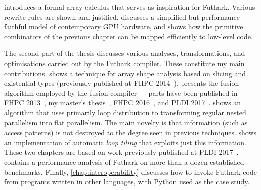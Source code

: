  introduces a formal array calculus that
serves as inspiration for Futhark.  Various rewrite rules are shown
and justified.   discusses a simplified but
performance-faithful model of contemporary GPU hardware, and shows
how the primitive combinators of the previous chapter can be mapped
efficiently to low-level code.

The second part of the thesis discusses various analyses,
transformations, and optimisations carried out by the Futhark
compiler.  These constitute my main contributions.
 shows a technique for array shape
analysis based on slicing and existential types (previously published
at FHPC 2014~\cite{henriksen2014size}).  
presents the fusion algorithm employed by the fusion compiler ---
parts have been published in FHPC 2013~\cite{henriksen2013t2}, my
master's thesis~\cite{henriksen2014exploiting}, FHPC
2016~\cite{Futhark:redomap}, and PLDI
2017~\cite{henriksen2017futhark}.
 shows an algorithm that uses
primarily loop distribution to transforming regular nested parallelism
into flat parallelism.  The main novelty is that information (such as
access patterns) is not destroyed to the degree seen in previous
techniques.   shows an implementation of
automatic \textit{loop tiling} that exploits just this information.
These two chapters are based on work previously published at PLDI
2017~\cite{henriksen2017futhark}.
 contains a performance
analysis of Futhark on more than a dozen established benchmarks.
Finally, \cref{chap:interoperability} discusses how to invoke
Futhark code from programs written in other languages, with Python
used as the case study.

